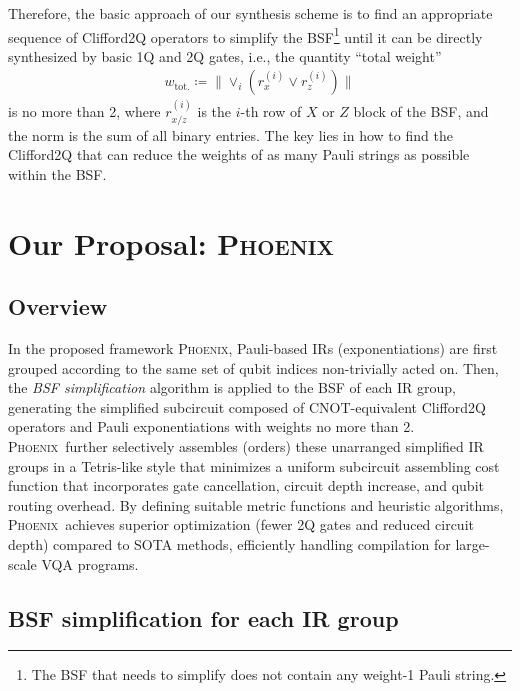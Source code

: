 \documentclass[conference,9pt]{IEEEtran}
\newcommand{\dquote}[1]{``#1''}
\newcommand{\phoenix}{\textsc{Phoenix}}
\newcommand{\CNOT}{\mathrm{CNOT}}
\newcommand{\totalWeight}{w_\mathrm{tot.}}
\begin{document}
    Therefore, the basic approach of our synthesis scheme is to find an appropriate sequence of Clifford2Q operators to simplify the BSF\footnote{The BSF that needs to simplify does not contain any weight-1 Pauli string. } until it can be directly synthesized by basic 1Q and 2Q gates, i.e., the quantity \dquote{total weight} 
    \begin{align}
        \totalWeight \coloneqq \lVert  \lor_i (r_x^{(i)}\lor r_z^{(i)})  \rVert
    \end{align}
    is no more than 2, where $r_{x/z}^{(i)}$ is the $i$-th row of $X$ or $Z$ block of the BSF, and the norm is the sum of all binary entries. The key lies in how to find the Clifford2Q that can reduce the weights of as many Pauli strings as possible within the BSF.




\section{Our Proposal: \phoenix}



\subsection{Overview}

    In the proposed framework \phoenix, Pauli-based IRs (exponentiations) are first grouped according to the same set of qubit indices non-trivially acted on. Then, the \emph{BSF simplification} algorithm is applied to the BSF of each IR group, generating the simplified subcircuit composed of $ \CNOT $-equivalent Clifford2Q operators and Pauli exponentiations with weights no more than 2. \phoenix\ further selectively assembles (orders) these unarranged simplified IR groups in a Tetris-like style that minimizes a uniform subcircuit assembling cost function that incorporates gate cancellation, circuit depth increase, and qubit routing overhead. By defining suitable metric functions and heuristic algorithms, \phoenix\ achieves superior optimization (fewer 2Q gates and reduced circuit depth) compared to SOTA methods, efficiently handling compilation for large-scale VQA programs.




\subsection{BSF simplification for each IR group}
\end{document}
